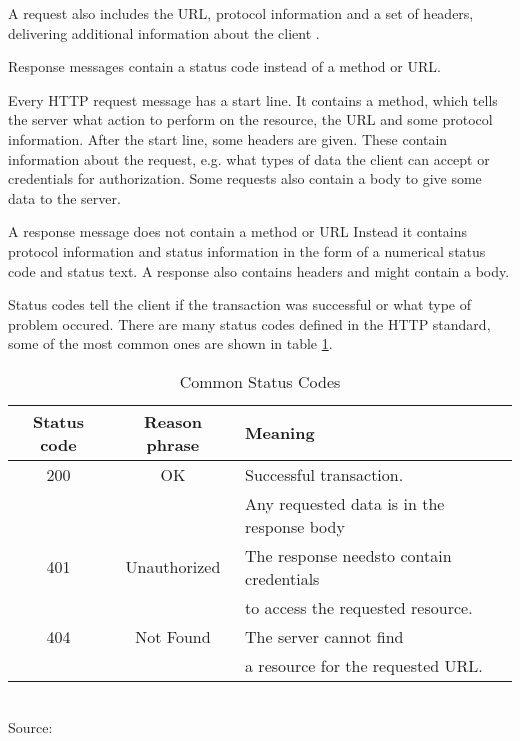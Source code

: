A request also includes the URL, protocol information and a set of headers, delivering
additional information about the client \cite[47]{gourley2002http}.

Response messages contain a status code instead of a method or URL.


Every HTTP request message has a start line.
It contains a method, which tells the server what action to perform on the resource, the URL
and some protocol information.\cite[47]{gourley2002http}
After the start line, some headers are given. These contain information about the request,
e.g. what types of data the client can accept or credentials for authorization.
Some requests also contain a body to give some data to the server. \cite[52]{gourley2002http}

A response message does not contain a method or URL
Instead it contains protocol information and status information in the form of a numerical
status code and status text.\cite[48]{gourley2002http}
A response also contains headers and might contain a body.\cite[52]{gourley2002http}

Status codes tell the client if the transaction was successful or what type of problem occured\cite[49]{gourley2002http}.
There are many status codes defined in the HTTP standard,
some of the most common ones are shown in table \ref{tbl:Common status codes}.

\begin{table}[H]
    \centering
    \caption{Common Status Codes}
    \label{tbl:Common status codes}
    \begin{tabular}{ccl} 
        \toprule
        Status code & Reason phrase & Meaning \\ [0.5ex]
        \midrule
        200 & OK & Successful transaction.\\ & & Any requested data is in the response body \\ [1ex]
        401 & Unauthorized & The response needsto contain credentials\\ & & to access the requested resource. \\ [1ex]
        404 & Not Found & The server cannot find\\ & & a resource for the requested URL. \\ [1ex]
        \bottomrule
    \end{tabular}
\\Source: \cite[50]{gourley2002http}
\end{table}


